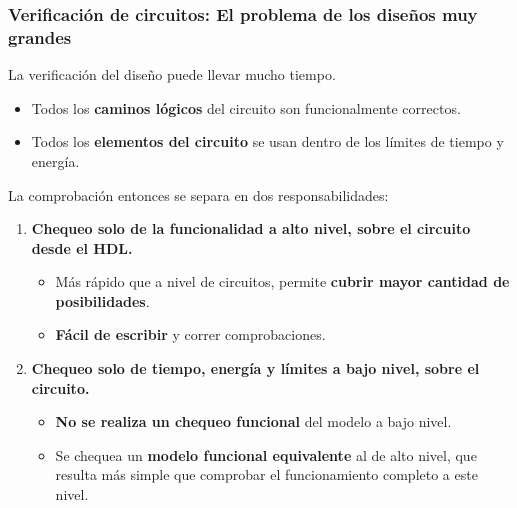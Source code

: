 \documentclass[aspectratio=169]{beamer}
\begin{document}
\begin{frame}[fragile,t]
    \frametitle{Verificación de circuitos: El problema de los diseños muy grandes}
    La verificación del diseño puede llevar mucho tiempo.\\
    \begin{itemize}
    \item Todos los \textbf{caminos lógicos} del circuito son funcionalmente correctos.
    \item Todos los \textbf{elementos del circuito} se usan dentro de los límites de tiempo y energía.
    \end{itemize}
    \pause
    \bigskip
    La comprobación entonces se separa en dos responsabilidades:\\
    \vspace{0.2cm}
    \begin{enumerate}
    \setlength\itemsep{0.2cm}
    \item<2-> \textbf{Chequeo solo de la \textcolor{naranjauca}{funcionalidad a alto nivel}, sobre el circuito desde el HDL.}
    \begin{itemize}
    \item \textcolor{verdeuca}{Más rápido que a nivel de circuitos, permite \textbf{cubrir mayor cantidad de posibilidades}.}
    \item \textcolor{verdeuca}{\textbf{Fácil de escribir} y correr comprobaciones.}
    \end{itemize}
    \item<3-> \textbf{Chequeo solo de \textcolor{naranjauca}{tiempo, energía y límites a bajo nivel}, sobre el circuito.}
    \begin{itemize}
    \item \textcolor{verdeuca}{\textbf{No se realiza un chequeo funcional} del modelo a bajo nivel.}
    \item \textcolor{verdeuca}{Se chequea un \textbf{modelo funcional equivalente} al de alto nivel, que resulta más simple que comprobar el funcionamiento completo a este nivel.}
    \end{itemize}
    \end{enumerate}
    \vspace{0.2cm}
\end{frame}
\end{document}
